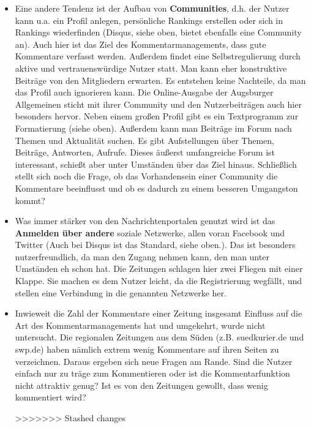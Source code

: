 \begin{itemize}
\item Eine andere Tendenz ist der Aufbau von {\bfseries Communities}, d.h. der Nutzer kann u.a. ein Profil anlegen, persönliche Rankings erstellen oder sich in Rankings wiederfinden (Disqus, siehe oben,  bietet ebenfalls eine Community an). Auch hier ist das Ziel des Kommentarmanagements, dass gute Kommentare verfasst werden. Außerdem findet eine Selbstregulierung durch aktive und vertrauenswürdige Nutzer statt. Man kann eher konstruktive Beiträge von den Mitgliedern erwarten. Es entstehen keine Nachteile, da man das Profil auch ignorieren kann.
Die Online-Ausgabe der Augsburger Allgemeinen sticht mit ihrer Community und den Nutzerbeiträgen auch hier besonders hervor. Neben einem großen Profil gibt es ein Textprogramm zur Formatierung (siehe oben). Außerdem kann man Beiträge im Forum nach Themen und Aktualität suchen. Es gibt Aufstellungen über Themen, Beiträge, Antworten, Aufrufe. Dieses äußerst umfangreiche Forum ist interessant, schießt aber unter Umständen über das Ziel hinaus. 
Schließlich stellt sich noch die Frage, ob das Vorhandensein einer Community die Kommentare beeinflusst und ob es dadurch zu einem besseren Umgangston kommt?\\

\item Was immer stärker von den Nachrichtenportalen genutzt wird ist das
{\bfseries Anmelden über andere} soziale Netzwerke, allen voran Facebook und Twitter (Auch bei Disqus ist das Standard, siehe oben.). Das ist besonders nutzerfreundlich, da man den Zugang nehmen kann, den man unter Umständen eh schon hat. Die Zeitungen schlagen hier zwei Fliegen mit einer Klappe. Sie machen es dem Nutzer leicht, da die Registrierung wegfällt, und stellen eine Verbindung in die genannten Netzwerke her. 

\item Inwieweit die Zahl der Kommentare einer Zeitung insgesamt Einfluss auf die Art des Kommentarmanagements hat und umgekehrt, wurde nicht
untersucht. Die regionalen Zeitungen aus dem Süden (z.B. suedkurier.de und swp.de) haben nämlich extrem wenig Kommentare auf ihren Seiten zu verzeichnen. 
Daraus ergeben sich neue Fragen am Rande. Sind die Nutzer einfach nur zu träge zum Kommentieren oder
ist die Kommentarfunktion nicht attraktiv genug? Ist es von den Zeitungen gewollt, dass wenig kommentiert wird? 

>>>>>>> Stashed changes
\end{itemize}





